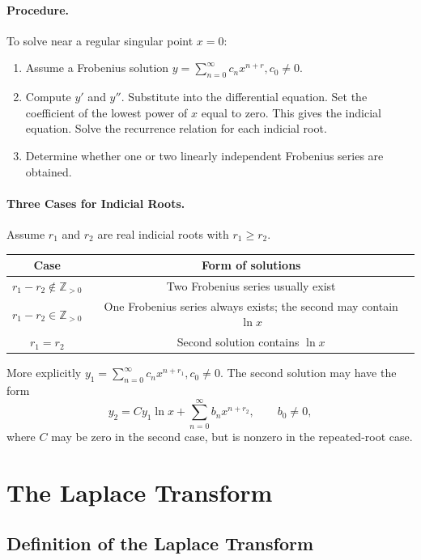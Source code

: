 \documentclass[oneside]{book}
\begin{document}
\paragraph{Procedure.}
To solve near a regular singular point $x=0$:
\begin{enumerate}
    \item Assume a Frobenius solution $y=\sum_{n=0}^{\infty} c_nx^{n+r},
        c_0\neq 0$.
    \item Compute $y'$ and $y''$. Substitute into the differential equation. Set the coefficient of the lowest power of $x$ equal to zero. This gives the indicial equation. Solve the recurrence relation for each indicial root.
    \item Determine whether one or two linearly independent Frobenius series are obtained.
\end{enumerate}

\paragraph{Three Cases for Indicial Roots.}
Assume $r_1$ and $r_2$ are real indicial roots with $r_1\ge r_2$.

\begin{center}
\begin{tabular}{c|c}
Case & Form of solutions\\
\hline
$r_1-r_2\notin \mathbb{Z}_{>0}$ &
Two Frobenius series usually exist\\[0.4em]
$r_1-r_2\in \mathbb{Z}_{>0}$ &
One Frobenius series always exists; the second may contain $\ln x$\\[0.4em]
$r_1=r_2$ &
Second solution contains $\ln x$
\end{tabular}
\end{center}
More explicitly $ y_1=\sum_{n=0}^{\infty} c_nx^{n+r_1}, c_0\neq 0$. The second solution may have the form
\[
    y_2=C y_1\ln x+\sum_{n=0}^{\infty} b_nx^{n+r_2},
    \qquad b_0\neq 0,
\]
where $C$ may be zero in the second case, but is nonzero in the repeated-root case.


\section{The Laplace Transform}

\subsection{Definition of the Laplace Transform}
\end{document}
